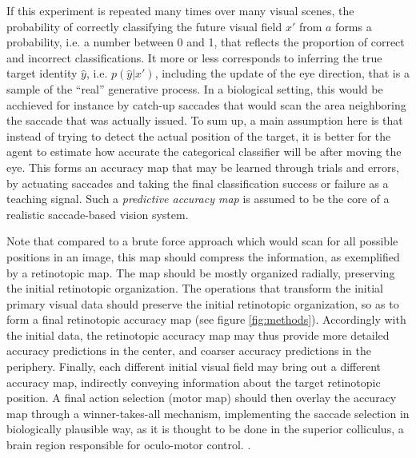 If this experiment is repeated many times over many visual scenes, the probability of correctly classifying the future visual field $x'$ from $a$ forms a probability, i.e. a number between 0 and 1, that reflects the proportion of correct and incorrect classifications.
\ICANN It more or less corresponds to inferring the true target identity $\hat{y}$, i.e. $p(\hat{y}|x')$, including the update of the eye direction, that is a sample of the ``real'' generative process.
In a biological setting, this would be acchieved for instance by catch-up saccades that would scan the area neighboring the saccade that was actually issued.
\fi
{}\ICANN
To sum up, a main assumption here is that instead of trying to detect the actual position of the target, it is better for the agent to estimate how accurate the categorical classifier will be after moving the eye. This forms an accuracy map that may be learned through trials and errors, by actuating saccades %
and taking the final classification success or failure as a teaching signal.\fi
Such a \emph{predictive accuracy map} is assumed to be the core of a realistic saccade-based vision system.

\ICANN Note that compared to a brute force approach which would scan for all possible positions in an image, this map should compress the information, as exemplified by a retinotopic map. The map should be mostly organized radially, preserving the initial retinotopic organization. %
\fi
The operations that transform the initial primary visual data should  preserve the initial retinotopic organization, so as to form a final  retinotopic accuracy map (see figure \ref{fig:methods}). Accordingly with the initial data, the retinotopic accuracy map may thus provide more detailed accuracy predictions in the center, and coarser accuracy predictions in the periphery.
Finally, each different initial visual field may bring out a different accuracy map, indirectly conveying information about the target retinotopic position.
A final action selection (motor map) should then overlay the accuracy map through a winner-takes-all mechanism, implementing the saccade selection in biologically plausible way, as it is thought to be done in the superior colliculus, a brain region responsible for oculo-motor control\ICANN .
.

